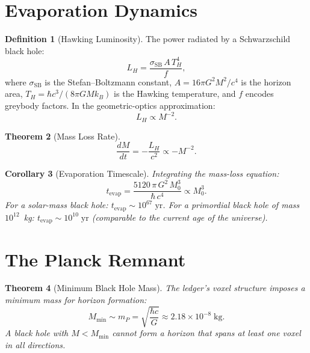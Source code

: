 \documentclass[12pt,a4paper]{article}
\newtheorem{theorem}{Theorem}[section]
\newtheorem{corollary}[theorem]{Corollary}
\theoremstyle{definition}
\newtheorem{definition}[theorem]{Definition}
\theoremstyle{remark}
\begin{document}
\section{Evaporation Dynamics}
\label{sec:dynamics}

\begin{definition}[Hawking Luminosity]
The power radiated by a Schwarzschild black hole:
\begin{equation}
  L_H = \frac{\sigma_{\mathrm{SB}}\,A\,T_H^4}{f},
\end{equation}
where $\sigma_{\mathrm{SB}}$ is the Stefan--Boltzmann constant,
$A = 16\pi G^2 M^2/c^4$ is the horizon area, $T_H = \hbar c^3/
(8\pi G M k_B)$ is the Hawking temperature, and $f$ encodes
greybody factors.  In the geometric-optics approximation:
\begin{equation}
  L_H \propto M^{-2}.
\end{equation}
\end{definition}

\begin{theorem}[Mass Loss Rate]
\begin{equation}
  \frac{dM}{dt} = -\frac{L_H}{c^2} \propto -M^{-2}.
\end{equation}
\end{theorem}

\begin{corollary}[Evaporation Timescale]
Integrating the mass-loss equation:
\begin{equation}
  t_{\mathrm{evap}} = \frac{5120\,\pi\,G^2\,M_0^3}
  {\hbar\,c^4} \propto M_0^3.
\end{equation}
For a solar-mass black hole:
$t_{\mathrm{evap}} \sim 10^{67}\;\mathrm{yr}$.
For a primordial black hole of mass $10^{12}$~kg:
$t_{\mathrm{evap}} \sim 10^{10}\;\mathrm{yr}$ (comparable to the
current age of the universe).
\end{corollary}

\section{The Planck Remnant}
\label{sec:remnant}

\begin{theorem}[Minimum Black Hole Mass]
\label{thm:min-mass}
The ledger's voxel structure imposes a minimum mass for horizon
formation:
\begin{equation}
  \boxed{M_{\mathrm{min}} \sim m_P
  = \sqrt{\frac{\hbar c}{G}} \approx 2.18 \times 10^{-8}
  \;\mathrm{kg}.}
\end{equation}
A black hole with $M < M_{\mathrm{min}}$ cannot form a horizon
that spans at least one voxel in all directions.
\end{theorem}
\end{document}
